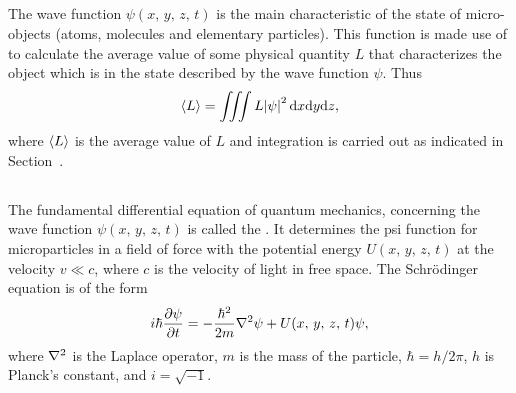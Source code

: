 \subsection{}\label{38.2.3} The wave function $\psi(x, \,y,\, z,\, t)$ is the main characteristic of the state of micro-objects (atoms, molecules and elementary particles). This function is made use of to calculate the average value of some physical quantity $L$ that characterizes the object which is in the state described by the wave function $\psi$. Thus
\begin{equation*}%
\expval{L} = \iiint L \abs{\psi}^{2}\, \dd x \dd y \dd z,
\end{equation*}
where $\expval{L}$ is the average value of $L$ and integration is carried out as indicated in Section~.

\subsection{}\label{38.2.4} The fundamental differential equation of quantum mechanics, concerning the wave function $\psi(x, \,y,\, z,\, t)$ is called the . It determines the psi function for microparticles in a field of force with the potential energy $U (x, \,y,\, z,\, t)$  at the velocity $v \ll c$, where $c$ is the velocity of light in free space. The Schr\"odinger equation is of the form
\begin{equation*}%
i \hbar \pdv{\psi}{t} = -\frac{\hbar^{2}}{2m} \laplacian \psi + U(x, \,y,\, z,\, t) \psi,
\end{equation*}
where $\laplacian$ is the Laplace operator, $m$ is the mass of the particle, $\hbar = h/2\pi$, $h$ is Planck's constant, and $i = \sqrt{-1}$.

